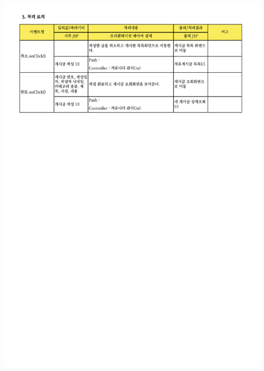 {{{{{{{{{{{{{{{{{{{{{{{{{{{{{{{{{{{{{{{{{{{{{{{{{\includegraphics[width=20cm]{./Figure/Analysis/Display/community/community_08.pdf} \\
}}}}}}}}}}}}}}}}}}}}}}}}}}}}}}}}}}}}}}}}}}}}}}}}}
